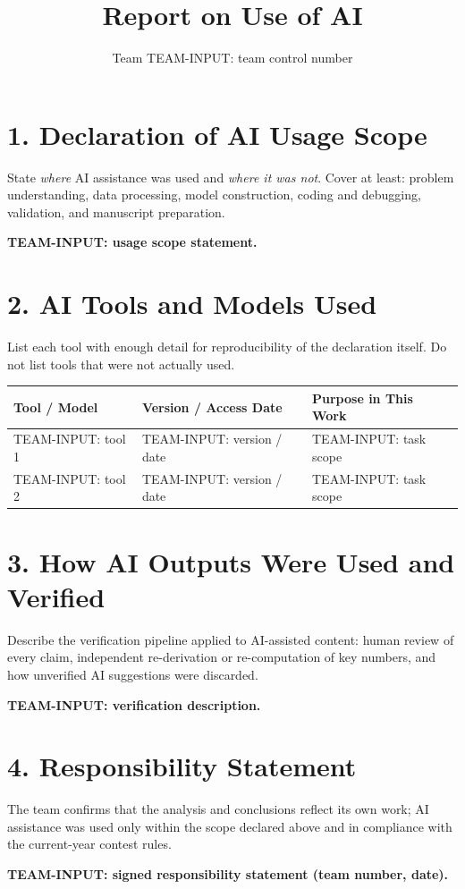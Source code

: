 \documentclass[11pt]{article}
\title{Report on Use of AI}
\author{Team TEAM-INPUT: team control number}
\date{}
\begin{document}
\maketitle

\section*{1. Declaration of AI Usage Scope}
State \emph{where} AI assistance was used and \emph{where it was not}.
Cover at least: problem understanding, data processing, model construction,
coding and debugging, validation, and manuscript preparation.

\medskip
\noindent\textbf{TEAM-INPUT: usage scope statement.}

\section*{2. AI Tools and Models Used}
List each tool with enough detail for reproducibility of the declaration
itself. Do not list tools that were not actually used.

\begin{table}[h]
\centering
\begin{tabular}{>{\raggedright\arraybackslash}p{3.4cm}
                >{\raggedright\arraybackslash}p{3.2cm}
                >{\raggedright\arraybackslash}p{6.2cm}}
\toprule
\textbf{Tool / Model} & \textbf{Version / Access Date} & \textbf{Purpose in This Work} \\
\midrule
TEAM-INPUT: tool 1 & TEAM-INPUT: version / date & TEAM-INPUT: task scope \\
TEAM-INPUT: tool 2 & TEAM-INPUT: version / date & TEAM-INPUT: task scope \\
\bottomrule
\end{tabular}
\end{table}

\section*{3. How AI Outputs Were Used and Verified}
Describe the verification pipeline applied to AI-assisted content:
human review of every claim, independent re-derivation or re-computation
of key numbers, and how unverified AI suggestions were discarded.

\medskip
\noindent\textbf{TEAM-INPUT: verification description.}

\section*{4. Responsibility Statement}
The team confirms that the analysis and conclusions reflect its own work;
AI assistance was used only within the scope declared above and in
compliance with the current-year contest rules.

\medskip
\noindent\textbf{TEAM-INPUT: signed responsibility statement (team number,
date).}
\end{document}
